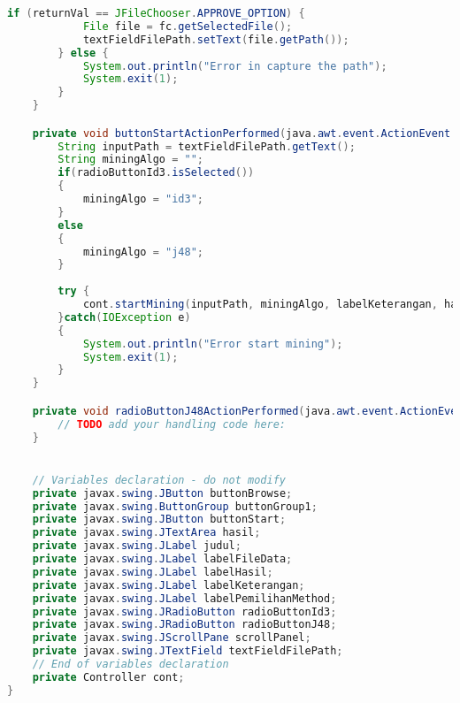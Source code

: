 \begin{lstlisting}[language=Java,basicstyle=\tiny,caption=View.java]
        if (returnVal == JFileChooser.APPROVE_OPTION) {
            File file = fc.getSelectedFile();
            textFieldFilePath.setText(file.getPath());
        } else {
            System.out.println("Error in capture the path");
            System.exit(1);
        }
    }                                            

    private void buttonStartActionPerformed(java.awt.event.ActionEvent evt) {                                            
        String inputPath = textFieldFilePath.getText();
        String miningAlgo = "";
        if(radioButtonId3.isSelected())
        {
            miningAlgo = "id3";
        }
        else
        {
            miningAlgo = "j48";
        }
        
        try {
            cont.startMining(inputPath, miningAlgo, labelKeterangan, hasil);
        }catch(IOException e)
        {
            System.out.println("Error start mining");
            System.exit(1);
        }
    }                                           

    private void radioButtonJ48ActionPerformed(java.awt.event.ActionEvent evt) {                                               
        // TODO add your handling code here:
    }                                              


    // Variables declaration - do not modify                     
    private javax.swing.JButton buttonBrowse;
    private javax.swing.ButtonGroup buttonGroup1;
    private javax.swing.JButton buttonStart;
    private javax.swing.JTextArea hasil;
    private javax.swing.JLabel judul;
    private javax.swing.JLabel labelFileData;
    private javax.swing.JLabel labelHasil;
    private javax.swing.JLabel labelKeterangan;
    private javax.swing.JLabel labelPemilihanMethod;
    private javax.swing.JRadioButton radioButtonId3;
    private javax.swing.JRadioButton radioButtonJ48;
    private javax.swing.JScrollPane scrollPanel;
    private javax.swing.JTextField textFieldFilePath;
    // End of variables declaration                   
    private Controller cont;
}

\end{lstlisting}

